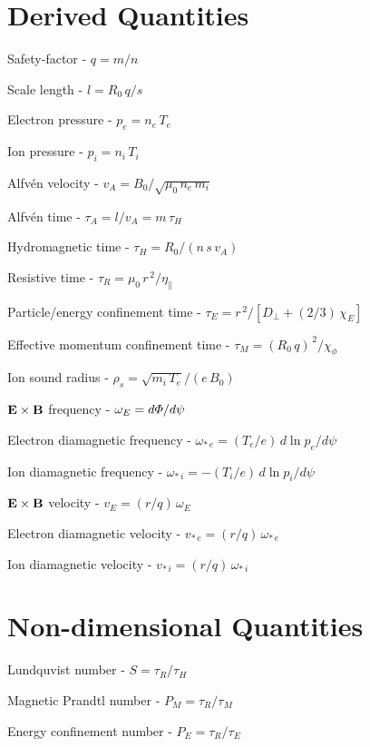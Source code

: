 \documentclass[notitlepage,12pt]{article}
\begin{document}
\section{Derived Quantities}
\begin{description}
\item Safety-factor - $q=m/n$
\item Scale length - $l = R_0\,q/s$ 
\item Electron pressure - $p_e = n_e\,T_e$
\item Ion pressure - $p_i = n_i\,T_i$
\item Alfv\'{e}n velocity - $v_A = B_0/\sqrt{\mu_0\,n_e\,m_i}$
\item Alfv\'{e}n time - $\tau_A= l/v_A =m\,\tau_H$
\item Hydromagnetic time - $\tau_H =R_0/(n\,s\,v_A)$
\item Resistive time - $\tau_R = \mu_0\,r^{\,2}/\eta_\parallel$
\item Particle/energy confinement time - $\tau_E= r^{\,2}/[D_\perp + (2/3)\,\chi_E]$
\item Effective momentum confinement time - $\tau_M = (R_0\,q)^{\,2}/\chi_\phi$
\item Ion sound radius - $\rho_s = \sqrt{m_i\,T_e}/(e\,B_0)$
\item ${\bf E}\times {\bf B}$ frequency - $\omega_E = d{\mit\Phi}/d\psi$
\item Electron diamagnetic frequency - $\omega_{\ast\,e} = (T_e/e)\,d\ln p_e/d\psi$
\item Ion diamagnetic frequency - $\omega_{\ast\,i} =- (T_i/e)\,d\ln p_i/d\psi$
\item ${\bf E}\times {\bf B}$ velocity - $v_E = (r/q)\,\omega_E$
\item Electron diamagnetic velocity -  $v_{\ast\,e} = (r/q)\,\omega_{\ast\,e}$
\item Ion diamagnetic velocity -  $v_{\ast\,i} = (r/q)\,\omega_{\ast\,i}$
\end{description}

\section{Non-dimensional Quantities}
\begin{description}
\item Lundquvist number - $S=\tau_R/\tau_H$
\item Magnetic Prandtl number - $P_M = \tau_R/\tau_M$
\item Energy confinement number - $P_E = \tau_R/\tau_E$
\end{description}
\end{document}
